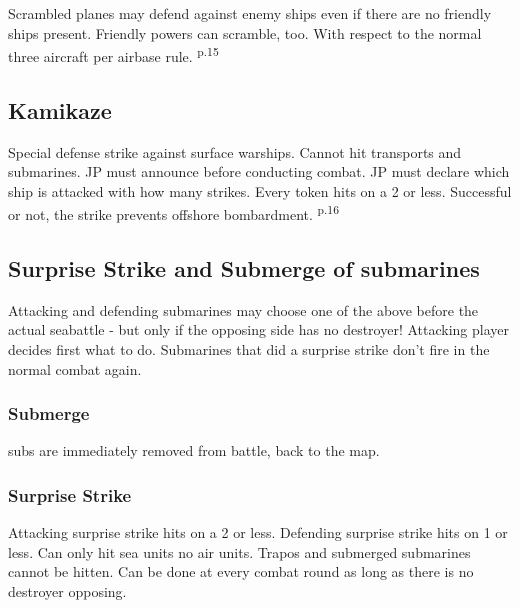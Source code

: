 \documentclass[10pt,a4paper,landscape]{article}
\begin{document}
\begin{multicols*}{3}
Scrambled planes may defend against enemy ships even if there are no friendly ships present. Friendly powers can scramble, too. With respect to the normal three aircraft per airbase rule. \textsuperscript{p.15}

\subsection*{Kamikaze}
Special defense strike against surface warships. Cannot hit transports and submarines. JP must announce before conducting combat. JP must declare which ship is attacked with how many strikes. Every token hits on a 2 or less. Successful or not, the strike prevents offshore bombardment. \textsuperscript{p.16}

\subsection*{Surprise Strike and Submerge of submarines}
Attacking and defending submarines may choose one of the above before the actual seabattle - but only if the opposing side has no destroyer! Attacking player decides first what to do. Submarines that did a surprise strike don't fire in the normal combat again.

\subsubsection*{Submerge}
subs are immediately removed from battle, back to the map.

\subsubsection*{Surprise Strike}
Attacking surprise strike hits on a 2 or less. Defending surprise strike hits on 1 or less. Can only hit sea units no air units. Trapos and submerged submarines cannot be hitten. Can be done at every combat round as long as there is no destroyer opposing.


\end{multicols*}
\end{document}
